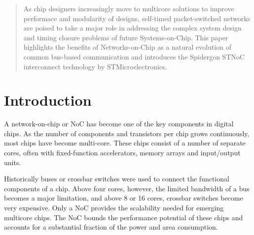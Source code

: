 
\newcommand{\docTitle}{The Spidergon Network-on-Chip}
\newcommand{\docAuthor}{Andrew Fecheyr Lippens}
\newcommand{\docDate}{\today}
\newcommand{\docSubject}{Redes en Chip}







\begin{abstract}

As chip designers increasingly move to multicore solutions to improve performace and modularity of designs, self-timed packet-switched networks are poised to take a major role in addressing the complex system design and timing closure problems of future Systems-on-Chip. 
This paper highlights the benefits of Networks-on-Chip as a natural evolution of common bus-based communication and introduces the Spidergon STNoC interconnect technology by STMicroelectronics. 

\end{abstract}

\setcounter{tocdepth}{2}
\begin{tableofcontents}
\end{tableofcontents}

\addtolength{\parskip}{0.5\baselineskip}

\newpage

\section{Introduction}\label{C:intro}

A network-on-chip or NoC has become one of the key components in digital chips. 
As the number of components and transistors per chip grows continuously, most chips have become multi-core. 
These chips consist of a number of separate cores, often with fixed-function accelerators, memory arrays and input/output units.
		
Historically buses or crossbar switches were used to connect the functional components of a chip. 
Above four cores, however, the limited bandwidth of a bus becomes a major limitation, and above 8 or 16 cores, crossbar switches become very expensive. 
Only a NoC provides the scalability needed for emerging multicore chips. 
The NoC bounds the performance potential of these chips and accounts for a substantial fraction of the power and area consumption.

